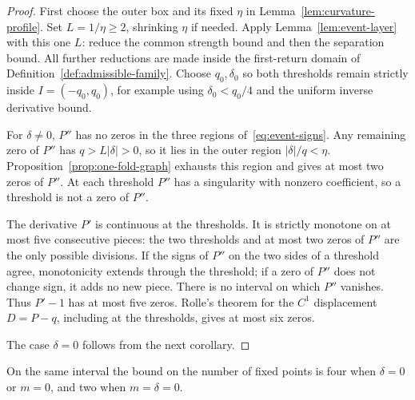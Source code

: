 \begin{proof}
First choose the outer box and its fixed \(\eta\) in
Lemma~\ref{lem:curvature-profile}. Set \(L=1/\eta\ge2\), shrinking
\(\eta\) if needed. Apply Lemma~\ref{lem:event-layer} with this one
\(L\): reduce the common strength bound and then the separation bound.
All further reductions are made inside the first-return domain of
Definition~\ref{def:admissible-family}. Choose \(q_0,\delta_0\) so both thresholds remain
strictly inside \(I=(-q_0,q_0)\), for example using
\(\delta_0<q_0/4\) and the uniform inverse derivative bound.

For \(\delta\ne0\), \(P''\) has no zeros in the three regions
of~\eqref{eq:event-signs}. Any remaining zero of \(P''\) has
\(q>L|\delta|>0\), so it lies in the outer region \(|\delta|/q<\eta\).
Proposition~\ref{prop:one-fold-graph} exhausts this region and gives at most
two zeros of \(P''\). At each threshold \(P''\) has a singularity with
nonzero coefficient, so a threshold is not a zero of \(P''\).

The derivative \(P'\) is continuous at the thresholds.
It is strictly monotone on at most five consecutive pieces: the two
thresholds and at most two zeros of \(P''\) are the only possible
divisions. If the signs of \(P''\) on the two sides of a threshold agree,
monotonicity extends through the threshold; if a zero of \(P''\) does not
change sign, it adds no new piece. There is no interval on which \(P''\)
vanishes. Thus \(P'-1\) has at most five zeros. Rolle's theorem for the
\(C^1\) displacement \(D=P-q\), including at the thresholds, gives at most
six zeros.

The case \(\delta=0\) follows from the next corollary.
\end{proof}

\begin{corollary}\label{cor:four-slices}
On the same interval the bound on the number of fixed points is four when
\(\delta=0\) or \(m=0\), and two when \(m=\delta=0\).
\end{corollary}

